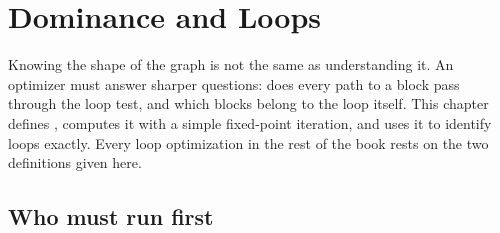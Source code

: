\chapter{Dominance and Loops}
\label{ch:dominance-loops}

Knowing the shape of the graph is not the same as understanding it.
An optimizer must answer sharper questions: does every path to a block pass through the loop test, and which blocks belong to the loop itself.
This chapter defines , computes it with a simple fixed-point iteration, and uses it to identify loops exactly.
Every loop optimization in the rest of the book rests on the two definitions given here.

\section{Who must run first}
\label{sec:ch08-must-run-first}

